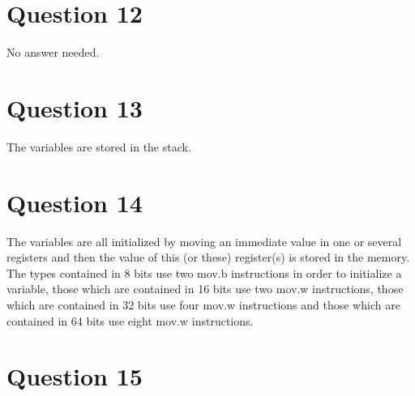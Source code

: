 \documentclass[a4paper,10pt]{article}
\begin{document}
\section*{Question 12}
No answer needed.

\section*{Question 13}
The variables are stored in the stack.

\section*{Question 14}
The variables are all initialized by moving an immediate value in one or several registers and then the value of  this (or these) register(s) is stored in the memory. The types contained in 8 bits use two mov.b instructions in order to initialize a variable, those which are contained in 16 bits use two mov.w instructions, those which are contained in 32 bits use four mov.w instructions and those which are contained in 64 bits use eight mov.w instructions.

\section*{Question 15}
\end{document}
